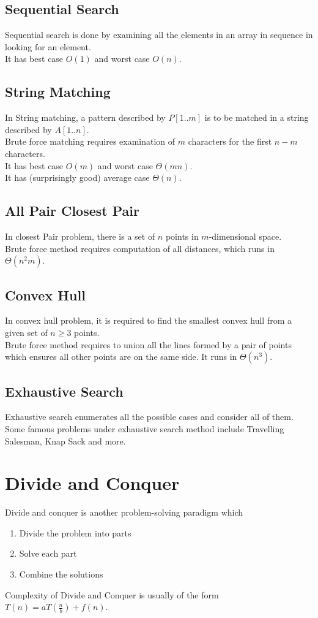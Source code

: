 \documentclass[12pt]{article}
\theoremstyle{definition}
\newcommand{\T}{\Theta}
\begin{document}
\subsection{Sequential Search}
Sequential search is done by examining all the elements in an array in sequence in looking for an element.\\
It has best case $O(1)$ and worst case $O(n)$.
\subsection{String Matching}
In String matching, a pattern described by $P[1..m]$ is to be matched in a string described by $A[1..n]$.\\
Brute force matching requires examination of $m$ characters for the first $n-m$ characters.\\
It has best case $O(m)$ and worst case $\T(mn)$.\\
It has (surprisingly good) average case $\T(n)$.
\subsection{All Pair Closest Pair}
In closest Pair problem, there is a set of $n$ points in $m$-dimensional space.\\
Brute force method requires computation of all distances, which runs in $\T(n^2m)$.
\subsection{Convex Hull}
In convex hull problem, it is required to find the smallest convex hull from a given set of $n\geq 3$ points.\\
Brute force method requires to union all the lines formed by a pair of points which ensures all other points are on the same side.
It runs in $\T(n^3)$.
\subsection{Exhaustive Search}
Exhaustive search enumerates all the possible cases and consider all of them.\\Some famous problems under exhaustive search method include Travelling Salesman, Knap Sack and more.
\clearpage
\section{Divide and Conquer}
Divide and conquer is another problem-solving paradigm which
\begin{enumerate}
  \item Divide the problem into parts
  \item Solve each part
  \item Combine the solutions
\end{enumerate}
Complexity of Divide and Conquer is usually of the form $T(n)=aT\left(\frac{n}{b}\right)+f(n)$.
\end{document}
